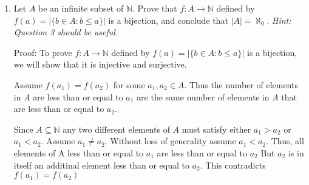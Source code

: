 \documentclass{article}
\newcommand{\bN}{\mathbb{N}}
\begin{document}
{\begin{enumerate}[labelindent=0pt,leftmargin=0pt]
\begin{enumerate}
    Since $g$ is both injective and surjective, it is a bijection. 
    Therefore, $|A - \{a\}| = n - 1$.
    $\Box$

    
    \item Let $B$ be a subset of $A$ that has cardinality $m\in\bN\cup\{0\}$. Use part (a) and induction on $m$ to prove that $|A-B| = n-m$. You may use $A-B=(A-(B-\{a\}))-\{a\}$ for any $a\in B$ without proof.

    Proof:
    Base Case $m=0$: if $m=0$ then $B$ is an empty set.
    Thus $A - B = A$ and $|A - B| = |A| = n$ 
    which implies $n - m = n - 0 = n$
    Thus the base case holds

    Inductive Step: Assume $|A - B| = n - k$ is true for some $k=m$ that is a 
    subset $B$ of $A$ with $|B| = k$
    
    Consider the subset $|B'|$ of $A$ with $|B'| = k+1$ 
    Consider $\exists a \in B'$, thus $B' - \{a\}$ is a subset of $A$ with cardinality $k$. 
    By the inductive Hypothesis we have $|A - (B' - \{a\})| = n - k$. 

    Consider the set  $A - B' = (A - (B' - \{a\})) - \{a\}$. From part (a), we know that $|(A - (B' - \{a\})) - \{a\}| = |A - (B' - \{a\})| - 1 = (n - k) - 1 = n - (k+1)$.


    Thus, by induction, the statement $|A-B| = n-m$ is true for all \(m \in \mathbb{N} \cup \{0\}\).


    
    \end{enumerate}

    \item Let $A$ be an infinite subset of $\bN$. Prove that $f:A\to \bN$ defined by $f(a)=|\{b\in A:b\leq a\}|$ is a bijection, and conclude that $|A|=\aleph_0$. \textit{Hint: Question 3 should be useful.}

    Proof:
    To prove $f:A\to \bN$ defined by $f(a)=|\{b\in A:b\leq a\}|$ is a bijection, we will show that it is injective and surjective. 

    Assume $f(a_1)=f(a_2)$ for some $a_1,a_2 \in A$. 
    Thus the number of elements in $A$ are less than or equal to $a_1$ are the same number of elements in $A$ that are less than or equal to $a_2$.

    Since $A \subseteq\bN$ any two different elements of $A$ must satisfy either $a_1 > a_2$ or $a_1 < a_2$. 
    Assume $a_1 \neq a_2$. 
    Without loss of generality assume $a_1 < a_2$. 
    Thus, all elements of A less than or equal to $a_1$ are less than or equal to $a_2$ But $a_2$ is in itself an additinal element less than or equal to $a_2$. This contradicts $f(a_1)=f(a_2)$


\end{enumerate}}
\end{document}
